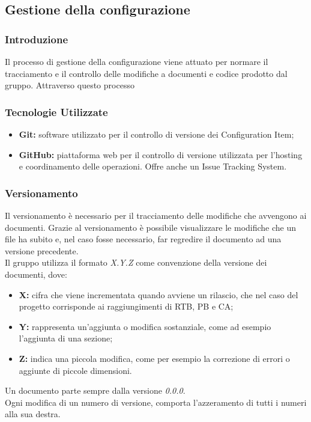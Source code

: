 \subsection{Gestione della configurazione}

\subsubsection{Introduzione}

Il processo di gestione della configurazione viene attuato per normare il tracciamento e il controllo delle modifiche a documenti e codice prodotto dal gruppo.
Attraverso questo processo 

\subsubsection{Tecnologie Utilizzate}

\begin{itemize}
    \item \textbf{Git:} software utilizzato per il controllo di versione dei Configuration Item;
    \item \textbf{GitHub:} piattaforma web per il controllo di versione utilizzata per l'hosting e coordinamento delle operazioni. Offre anche un Issue Tracking System.
\end{itemize}

\subsubsection{Versionamento}

Il versionamento è necessario per il tracciamento delle modifiche che avvengono ai documenti. Grazie al versionamento è possibile visualizzare le modifiche che un file ha subito e, nel caso fosse necessario, far regredire il documento ad una versione precedente. \\
Il gruppo utilizza il formato \textit{X.Y.Z} come convenzione della versione dei documenti, dove:
\begin{itemize}
    \item \textbf{X:} cifra che viene incrementata quando avviene un rilascio, che nel caso del progetto corrisponde ai raggiungimenti di RTB, PB e CA;
    \item \textbf{Y:} rappresenta un'aggiunta o modifica sostanziale, come ad esempio l'aggiunta di una sezione;
    \item \textbf{Z:} indica una piccola modifica, come per esempio la correzione di errori o aggiunte di piccole dimensioni.
\end{itemize}
Un documento parte sempre dalla versione \textit{0.0.0}. \\
Ogni modifica di un numero di versione, comporta l'azzeramento di tutti i numeri alla sua destra.

